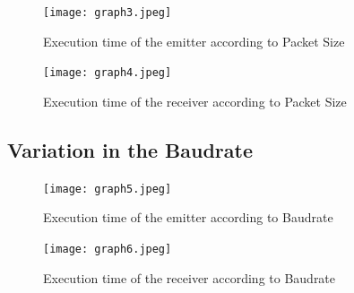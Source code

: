 \documentclass[11pt]{article}
\begin{document}
\begin{figure}[h]
    \centering
    \texttt{[image: graph3.jpeg]}
    \caption{Execution time of the emitter according to Packet Size}
\end{figure}

\begin{figure}[h]
    \centering
    \texttt{[image: graph4.jpeg]}
    \caption{Execution time of the receiver according to Packet Size}
\end{figure}

\newpage

\subsection*{Variation in the Baudrate}

\begin{figure}[h]
    \centering
    \texttt{[image: graph5.jpeg]}
    \caption{Execution time of the emitter according to Baudrate}
\end{figure}

\begin{figure}[h]
    \centering
    \texttt{[image: graph6.jpeg]}
    \caption{Execution time of the receiver according to Baudrate}
\end{figure}
\end{document}
